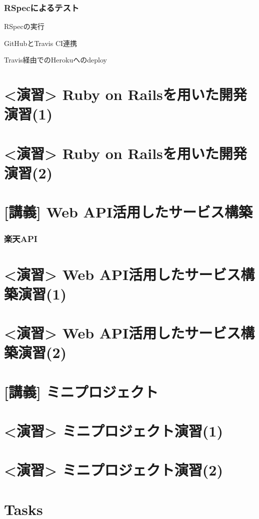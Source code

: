 \documentclass[12pt, t, aspectratio=169]{beamer}
\begin{document}
\section{RSpecによるテスト}
\label{sec-10-3}
\begin{frame}[label=sec-10-3-1]{RSpecの実行}
\end{frame}
\begin{frame}[label=sec-10-3-2]{GitHubとTravis CI連携}
\end{frame}
\begin{frame}[label=sec-10-3-3]{Travis経由でのHerokuへのdeploy}
\end{frame}
\part{<演習> Ruby on Railsを用いた開発演習(1)}
\label{sec-11}
\part{<演習> Ruby on Railsを用いた開発演習(2)}
\label{sec-12}
\part{[講義] Web API活用したサービス構築}
\label{sec-13}
\section{楽天API}
\label{sec-13-1}
\part{<演習> Web API活用したサービス構築演習(1)}
\label{sec-14}
\part{<演習> Web API活用したサービス構築演習(2)}
\label{sec-15}
\part{[講義] ミニプロジェクト}
\label{sec-16}
\part{<演習> ミニプロジェクト演習(1)}
\label{sec-17}
\part{<演習> ミニプロジェクト演習(2)}
\label{sec-18}
\part{Tasks}
\label{sec-19}
\end{document}

